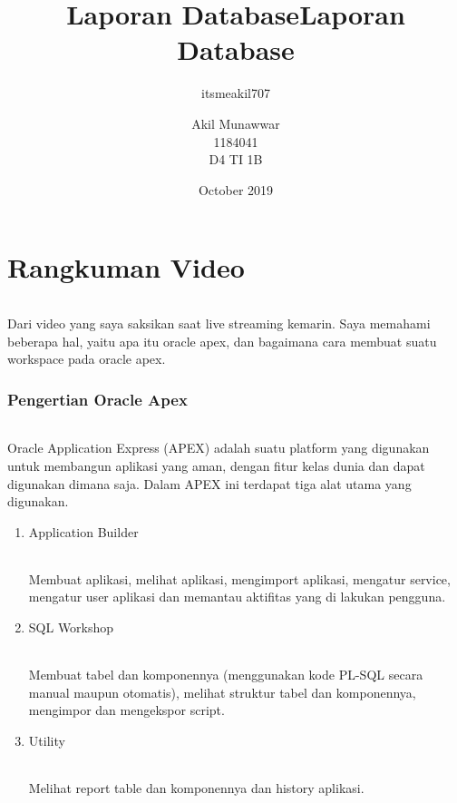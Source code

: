 \documentclass{article}
\title{Laporan Database}
\author{itsmeakil707 }
\date{October 2019}
\begin{document}
\title{Laporan Database}
\author{Akil Munawwar \\ 1184041 \\ D4 TI 1B}
\maketitle

\part{Rangkuman Video}
\paragraph{}
Dari video yang saya saksikan saat live streaming kemarin. Saya memahami beberapa hal, yaitu apa itu oracle apex, dan bagaimana cara membuat suatu workspace pada oracle apex.
\section{Pengertian Oracle Apex}
\paragraph{}
Oracle Application Express (APEX) adalah suatu platform yang digunakan untuk membangun aplikasi yang aman, dengan fitur kelas dunia dan dapat digunakan dimana saja. Dalam APEX ini terdapat tiga alat utama yang digunakan.
\begin{enumerate}
    \item Application Builder
    \paragraph{} Membuat aplikasi, melihat aplikasi, mengimport aplikasi, mengatur service, mengatur user aplikasi dan memantau aktifitas yang di lakukan pengguna.
    \item SQL Workshop
    \paragraph{} Membuat tabel dan komponennya (menggunakan kode PL-SQL secara manual maupun otomatis), melihat struktur tabel dan komponennya, mengimpor dan mengekspor script.
    \item Utility
    \paragraph{} Melihat report table dan komponennya dan history aplikasi.
\end{enumerate}
\newpage
\end{document}
